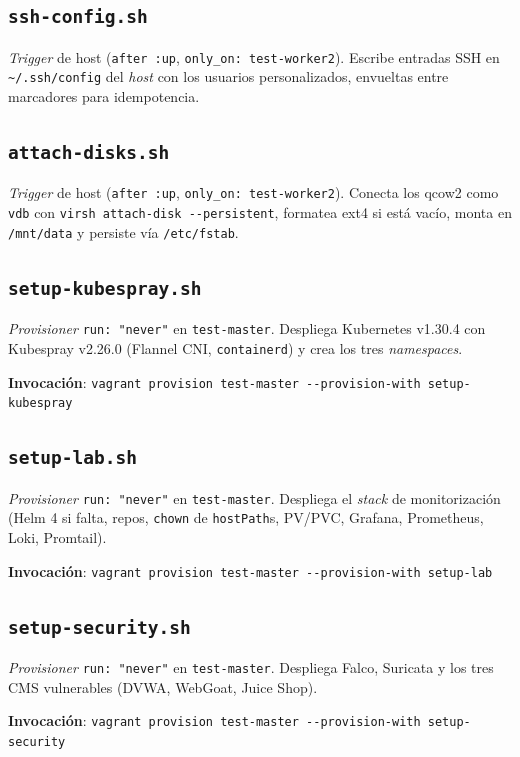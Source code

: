 
\subsection{\texttt{ssh-config.sh}}

\emph{Trigger} de host (\texttt{after :up}, \texttt{only\_on: test-worker2}). Escribe entradas SSH en \texttt{\textasciitilde/.ssh/config} del \emph{host} con los usuarios personalizados, envueltas entre marcadores para idempotencia.


\subsection{\texttt{attach-disks.sh}}

\emph{Trigger} de host (\texttt{after :up}, \texttt{only\_on: test-worker2}). Conecta los qcow2 como \texttt{vdb} con \texttt{virsh attach-disk -{}-persistent}, formatea ext4 si está vacío, monta en \texttt{/mnt/data} y persiste vía \texttt{/etc/fstab}.


\subsection{\texttt{setup-kubespray.sh}}

\emph{Provisioner} \texttt{run: "never"} en \texttt{test-master}. Despliega Kubernetes v1.30.4 con Kubespray v2.26.0 (Flannel CNI, \texttt{containerd}) y crea los tres \emph{namespaces}.

\textbf{Invocación}: \texttt{vagrant provision test-master -{}-provision-with setup-kubespray}


\subsection{\texttt{setup-lab.sh}}

\emph{Provisioner} \texttt{run: "never"} en \texttt{test-master}. Despliega el \emph{stack} de monitorización (Helm 4 si falta, repos, \texttt{chown} de \texttt{hostPath}s, PV/PVC, Grafana, Prometheus, Loki, Promtail).

\textbf{Invocación}: \texttt{vagrant provision test-master -{}-provision-with setup-lab}


\subsection{\texttt{setup-security.sh}}

\emph{Provisioner} \texttt{run: "never"} en \texttt{test-master}. Despliega Falco, Suricata y los tres CMS vulnerables (DVWA, WebGoat, Juice Shop).

\textbf{Invocación}: \texttt{vagrant provision test-master -{}-provision-with setup-security}

